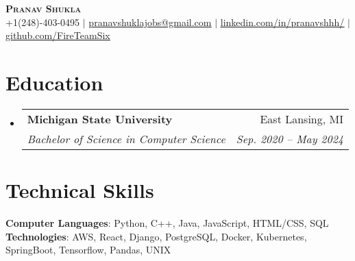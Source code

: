 \documentclass[letterpaper,11pt]{article}
\makeatletter
\newcommand{\resumeSubheading}[4]{
  \vspace{-2pt}\item
    \begin{tabular*}{0.97\textwidth}[t]{l@{\extracolsep{\fill}}r}
      \textbf{#1} & #2 \\
      \textit{\small#3} & \textit{\small #4} \\
    \end{tabular*}\vspace{-7pt}
}
\newcommand{\resumeSubHeadingListStart}{\begin{itemize}[leftmargin=0.15in, label={}]}
\newcommand{\resumeSubHeadingListEnd}{\end{itemize}}
\makeatother
\begin{document}

\begin{center}
    \textbf{\Huge \scshape Pranav Shukla} \\ \vspace{1pt}
    \small +1(248)-403-0495 $|$ \href{mailto:pranavshuklajobs@gmail.com}{\underline{pranavshuklajobs@gmail.com}} $|$ 
    \href{https://www.linkedin.com/in/pranavshhh/}{\underline{linkedin.com/in/pranavshhh/}} $|$
    \href{https://github.com/FireTeamSix}{\underline{github.com/FireTeamSix}}
\end{center}


\section{Education}
  \resumeSubHeadingListStart
    \resumeSubheading
      {Michigan State University}{East Lansing, MI}
      {Bachelor of Science in Computer Science}{Sep. 2020 -- May 2024}
  \resumeSubHeadingListEnd

\section{Technical Skills}
 \begin{itemize}[leftmargin=0.15in, label={}]
    \small{\item{
     \textbf{Computer Languages}{: Python, C++, Java, JavaScript, HTML/CSS, SQL} \\
     \textbf{Technologies}{: AWS, React, Django, PostgreSQL, Docker, Kubernetes, SpringBoot, Tensorflow, Pandas, UNIX} \\
    }}
 \end{itemize}

\end{document}
